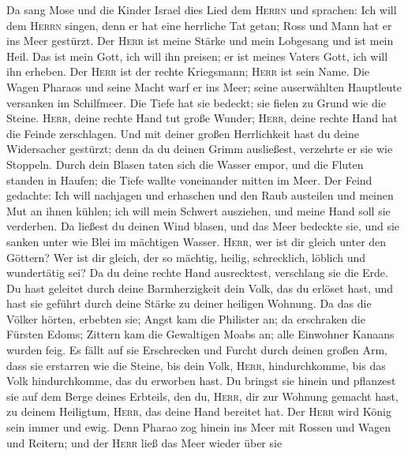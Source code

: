  Da sang Mose und die Kinder Israel dies Lied dem
\textsc{Herrn} und sprachen: Ich will dem \textsc{Herrn} singen, denn er
hat eine herrliche Tat getan; Ross und Mann hat er ins Meer gestürzt.
 Der \textsc{Herr} ist meine Stärke und mein Lobgesang und
ist mein Heil. Das ist mein Gott, ich will ihn preisen; er ist meines
Vaters Gott, ich will ihn erheben.  Der \textsc{Herr} ist
der rechte Kriegsmann; \textsc{Herr} ist sein Name.  Die
Wagen Pharaos und seine Macht warf er ins Meer; seine auserwählten
Hauptleute versanken im Schilfmeer.  Die Tiefe hat sie
bedeckt; sie fielen zu Grund wie die Steine. 
\textsc{Herr}, deine rechte Hand tut große Wunder; \textsc{Herr}, deine
rechte Hand hat die Feinde zerschlagen.  Und mit deiner
großen Herrlichkeit hast du deine Widersacher gestürzt; denn da du
deinen Grimm ausließest, verzehrte er sie wie Stoppeln. 
Durch dein Blasen taten sich die Wasser empor, und die Fluten standen in
Haufen; die Tiefe wallte voneinander mitten im Meer.  Der
Feind gedachte: Ich will nachjagen und erhaschen und den Raub austeilen
und meinen Mut an ihnen kühlen; ich will mein Schwert ausziehen, und
meine Hand soll sie verderben.  Da ließest du deinen Wind
blasen, und das Meer bedeckte sie, und sie sanken unter wie Blei im
mächtigen Wasser.  \textsc{Herr}, wer ist dir gleich
unter den Göttern? Wer ist dir gleich, der so mächtig, heilig,
schrecklich, löblich und wundertätig sei?  Da du deine
rechte Hand ausrecktest, verschlang sie die Erde.  Du
hast geleitet durch deine Barmherzigkeit dein Volk, das du erlöset hast,
und hast sie geführt durch deine Stärke zu deiner heiligen Wohnung.
 Da das die Völker hörten, erbebten sie; Angst kam die
Philister an;  da erschraken die Fürsten Edoms; Zittern
kam die Gewaltigen Moabs an; alle Einwohner Kanaans wurden feig.
 Es fällt auf sie Erschrecken und Furcht durch deinen
großen Arm, dass sie erstarren wie die Steine, bis dein Volk,
\textsc{Herr}, hindurchkomme, bis das Volk hindurchkomme, das du
erworben hast.  Du bringst sie hinein und pflanzest sie
auf dem Berge deines Erbteils, den du, \textsc{Herr}, dir zur Wohnung
gemacht hast, zu deinem Heiligtum, \textsc{Herr}, das deine Hand
bereitet hat.  Der \textsc{Herr} wird König sein immer
und ewig.  Denn Pharao zog hinein ins Meer mit Rossen und
Wagen und Reitern; und der \textsc{Herr} ließ das Meer wieder über sie
